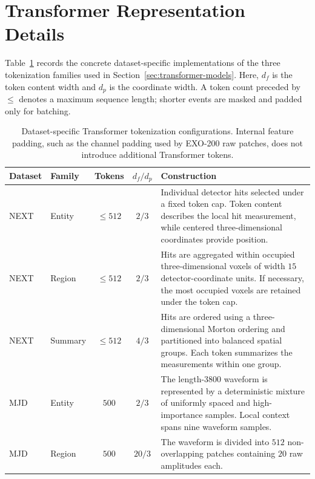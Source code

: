 \section{Transformer Representation Details}
\label{app:transformer-representations}

Table~\ref{tab:transformer-tokenization-configs} records the concrete
dataset-specific implementations of the three tokenization families used in
Section~\ref{sec:transformer-models}. Here, $d_f$ is the token content
width and $d_p$ is the coordinate width. A token count preceded by
$\leq$ denotes a maximum sequence length; shorter events are masked and
padded only for batching.

\begin{table}[!htbp]
\centering
\caption{Dataset-specific Transformer tokenization configurations. Internal
feature padding, such as the channel padding used by EXO-200 raw patches,
does not introduce additional Transformer tokens.}
\label{tab:transformer-tokenization-configs}
\footnotesize
\setlength{\tabcolsep}{3pt}
\renewcommand{\arraystretch}{1.08}
\begin{tabularx}{\linewidth}{@{}llccX@{}}
\toprule
Dataset
& Family
& Tokens
& $d_f/d_p$
& Construction \\
\midrule

NEXT
& Entity
& $\leq512$
& $2/3$
& Individual detector hits selected under a fixed token cap. Token content
describes the local hit measurement, while centered three-dimensional
coordinates provide position. \\

NEXT
& Region
& $\leq512$
& $2/3$
& Hits are aggregated within occupied three-dimensional voxels of width
$15$ detector-coordinate units. If necessary, the most occupied voxels are
retained under the token cap. \\

NEXT
& Summary
& $\leq512$
& $4/3$
& Hits are ordered using a three-dimensional Morton ordering and partitioned
into balanced spatial groups. Each token summarizes the measurements within
one group. \\

\midrule

MJD
& Entity
& $500$
& $2/3$
& The length-$3800$ waveform is represented by a deterministic mixture
of uniformly spaced and high-importance samples. Local context spans nine
waveform samples. \\

MJD
& Region
& $500$
& $20/3$
& The waveform is divided into $512$ non-overlapping patches containing
$20$ raw amplitudes each. \\


\end{tabularx}
\end{table}
